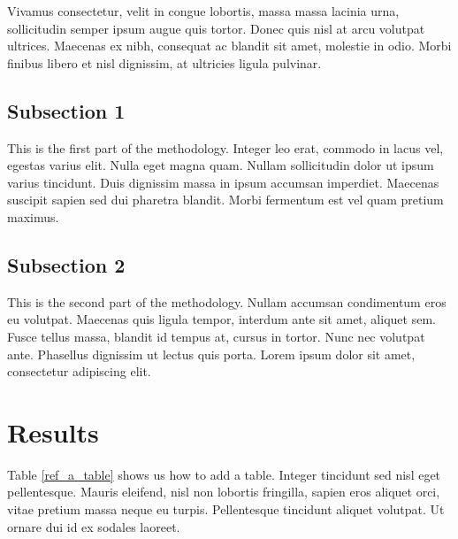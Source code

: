 \documentclass[12pt,a4paperpaper,]{report}
\begin{document}
Vivamus consectetur, velit in congue lobortis, massa massa lacinia urna,
sollicitudin semper ipsum augue quis tortor. Donec quis nisl at arcu
volutpat ultrices. Maecenas ex nibh, consequat ac blandit sit amet,
molestie in odio. Morbi finibus libero et nisl dignissim, at ultricies
ligula pulvinar.

\subsection{Subsection 1}\label{subsection-1-1}

This is the first part of the methodology. Integer leo erat, commodo in
lacus vel, egestas varius elit. Nulla eget magna quam. Nullam
sollicitudin dolor ut ipsum varius tincidunt. Duis dignissim massa in
ipsum accumsan imperdiet. Maecenas suscipit sapien sed dui pharetra
blandit. Morbi fermentum est vel quam pretium maximus.

\subsection{Subsection 2}\label{subsection-2-2}

This is the second part of the methodology. Nullam accumsan condimentum
eros eu volutpat. Maecenas quis ligula tempor, interdum ante sit amet,
aliquet sem. Fusce tellus massa, blandit id tempus at, cursus in tortor.
Nunc nec volutpat ante. Phasellus dignissim ut lectus quis porta. Lorem
ipsum dolor sit amet, consectetur adipiscing elit.

\section{Results}\label{results-3}

Table \ref{ref_a_table} shows us how to add a table. Integer tincidunt
sed nisl eget pellentesque. Mauris eleifend, nisl non lobortis
fringilla, sapien eros aliquet orci, vitae pretium massa neque eu
turpis. Pellentesque tincidunt aliquet volutpat. Ut ornare dui id ex
sodales laoreet.

\newpage
\end{document}
